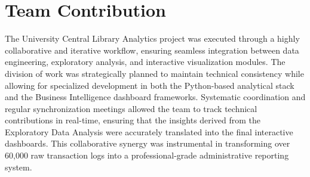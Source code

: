 \documentclass[12pt,a4paper]{report}
\begin{document}
\section{Team Contribution}
The University Central Library Analytics project was executed through a highly collaborative and iterative workflow, ensuring seamless integration between data engineering, exploratory analysis, and interactive visualization modules. The division of work was strategically planned to maintain technical consistency while allowing for specialized development in both the Python-based analytical stack and the Business Intelligence dashboard frameworks. Systematic coordination and regular synchronization meetings allowed the team to track technical contributions in real-time, ensuring that the insights derived from the Exploratory Data Analysis were accurately translated into the final interactive dashboards. This collaborative synergy was instrumental in transforming over 60,000 raw transaction logs into a professional-grade administrative reporting system.
\end{document}
